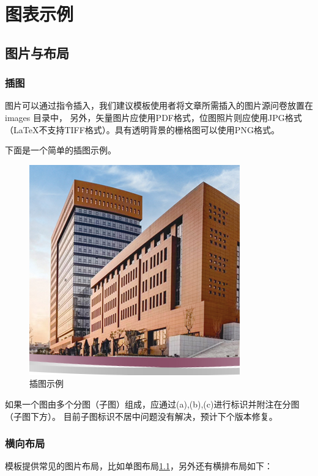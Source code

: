 \chapter{图表示例}

\section{图片与布局}

\subsection{插图}

图片可以通过指令插入，我们建议模板使用者将文章所需插入的图片源问卷放置在 images 目录中，
另外，矢量图片应使用PDF格式，位图照片则应使用JPG格式（LaTeX不支持TIFF格式）。具有透明背景的栅格图可以使用PNG格式。

下面是一个简单的插图示例。

\begin{figure}[hbt]
    \centering
    \includegraphics[width=0.3\linewidth]{hutb_building.png}
    \caption{插图示例}
    \label{f.example}
\end{figure}


如果一个图由多个分图（子图）组成，应通过(a),(b),(c)进行标识并附注在分图（子图下方）。
目前子图标识不居中问题没有解决，预计下个版本修复。

\subsection{横向布局}

模板提供常见的图片布局，比如单图布局\ref{f.example}，另外还有横排布局如下：


